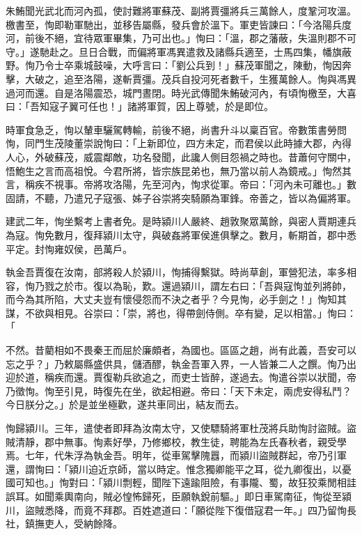 \begin{pinyinscope}
朱鮪聞光武北而河內孤，使討難將軍蘇茂、副將賈彊將兵三萬餘人，度鞏河攻溫。檄書至，恂即勒軍馳出，並移告屬縣，發兵會於溫下。軍吏皆諫曰：「今洛陽兵度河，前後不絕，宜待眾軍畢集，乃可出也。」恂曰：「溫，郡之藩蔽，失溫則郡不可守。」遂馳赴之。旦日合戰，而偏將軍馮異遣救及諸縣兵適至，士馬四集，幡旗蔽野。恂乃令士卒乘城鼓噪，大呼言曰：「劉公兵到！」蘇茂軍聞之，陳動，恂因奔擊，大破之，追至洛陽，遂斬賈彊。茂兵自投河死者數千，生獲萬餘人。恂與馮異過河而還。自是洛陽震恐，城門晝閉。時光武傳聞朱鮪破河內，有頃恂檄至，大喜曰：「吾知寇子翼可任也！」諸將軍賀，因上尊號，於是即位。

時軍食急乏，恂以輦車驪駕轉輸，前後不絕，尚書升斗以稟百官。帝數策書勞問恂，同門生茂陵董崇說恂曰：「上新即位，四方未定，而君侯以此時據大郡，內得人心，外破蘇茂，威震鄰敵，功名發聞，此讒人側目怨禍之時也。昔蕭何守關中，悟鮑生之言而高祖悅。今君所將，皆宗族昆弟也，無乃當以前人為鏡戒。」恂然其言，稱疾不視事。帝將攻洛陽，先至河內，恂求從軍。帝曰：「河內未可離也。」數固請，不聽，乃遣兄子寇張、姊子谷崇將突騎願為軍鋒。帝善之，皆以為偏將軍。

建武二年，恂坐繫考上書者免。是時潁川人嚴終、趙敦聚眾萬餘，與密人賈期連兵為寇。恂免數月，復拜潁川太守，與破姦將軍侯進俱擊之。數月，斬期首，郡中悉平定。封恂雍奴侯，邑萬戶。

執金吾賈復在汝南，部將殺人於潁川，恂捕得繫獄。時尚草創，軍營犯法，率多相容，恂乃戮之於市。復以為恥，歎。還過潁川，謂左右曰：「吾與寇恂並列將帥，而今為其所陷，大丈夫豈有懷侵怨而不決之者乎？今見恂，必手劍之！」恂知其謀，不欲與相見。谷崇曰：「崇，將也，得帶劍侍側。卒有變，足以相當。」恂曰：「

不然。昔藺相如不畏秦王而屈於廉頗者，為國也。區區之趙，尚有此義，吾安可以忘之乎？」乃敕屬縣盛供具，儲酒醪，執金吾軍入界，一人皆兼二人之饌。恂乃出迎於道，稱疾而還。賈復勒兵欲追之，而吏士皆醉，遂過去。恂遣谷崇以狀聞，帝乃徵恂。恂至引見，時復先在坐，欲起相避。帝曰：「天下未定，兩虎安得私鬥？今日朕分之。」於是並坐極歡，遂共車同出，結友而去。

恂歸潁川。三年，遣使者即拜為汝南太守，又使驃騎將軍杜茂將兵助恂討盜賊。盜賊清靜，郡中無事。恂素好學，乃修鄉校，教生徒，聘能為左氏春秋者，親受學焉。七年，代朱浮為執金吾。明年，從車駕擊隗囂，而潁川盜賊群起，帝乃引軍還，謂恂曰：「潁川迫近京師，當以時定。惟念獨卿能平之耳，從九卿復出，以憂國可知也。」恂對曰：「潁川剽輕，聞陛下遠踰阻險，有事隴、蜀，故狂狡乘閒相詿誤耳。如聞乘輿南向，賊必惶怖歸死，臣願執銳前驅。」即日車駕南征，恂從至潁川，盜賊悉降，而竟不拜郡。百姓遮道曰：「願從陛下復借寇君一年。」四乃留恂長社，鎮撫吏人，受納餘降。


\end{pinyinscope}
